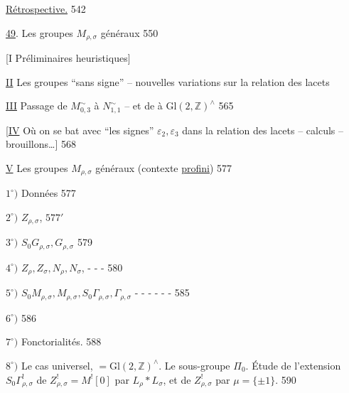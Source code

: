  \uline{Rétrospective.} \hfill 542



\uline{49}. Les groupes \(M_{\rho,\sigma}\) généraux \hfill 550

[I Préliminaires heuristiques]

\uline{II} Les groupes   ``sans signe'' -- nouvelles
variations sur la relation des lacets \hfill {}

\uline{III} Passage de \(M_{0,3}^{\sim}\) à \(N_{1,1}^{\sim}\) -- et de
 à \(\mathrm{Gl}(2,\mathbb Z)^{\wedge}\) \hfill 565

[\uline{IV} Où on se bat avec ``les signes'' \(\varepsilon_2,\varepsilon_3\)
dans la relation des lacets -- calculs -- brouillons\ldots] \hfill 568 

\textcircled{\uline{V}} Les groupes \(M_{\rho,\sigma}\) généraux
(contexte \uline{profini}) \hfill 577

\(1^{\circ})\) Données \hfill 577

\(2^{\circ})\) \(Z_{\rho,\sigma}\), \unsure{\(\sigma_{\rho,\sigma}\)|\(\delta_{\rho,\sigma}\)} \hfill \(577'\)

\(3^{\circ})\) \(S_0G_{\rho,\sigma},G_{\rho,\sigma}\) \hfill 579

\(4^{\circ})\) \(Z_\rho,Z_\sigma,N_\rho,N_\sigma\),
 \hfill - - - 580

\(5^{\circ})\) \(S_0M_{\rho,\sigma},M_{\rho,\sigma},S_0\Gamma_{\rho,\sigma},\Gamma_{\rho,\sigma}\)
\hfill - - - - - - 585

\(6^{\circ})\) 
\hfill 586

\(7^{\circ})\) Fonctorialités. \hfill 588

\uline{\(8^{\circ})\)} Le cas universel, \(=\mathrm{Gl}(2,\mathbb Z)^{\wedge}\).
Le  sous-groupe \(\Pi_0\). Étude de l'extension
\(S_0\Gamma_{\rho,\sigma}^{!}\) de \(Z_{\rho,\sigma}^{!}=M^{!}[0]\) par
\(L_\rho*L_\sigma\), et  de
\(Z_{\rho,\sigma}^{!}\) par \(\mu=\{\pm1\}\).
\hfill {} 590

